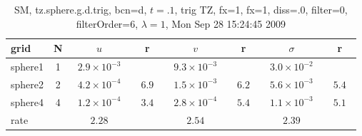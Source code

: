 \begin{table}[hbt]\tableFont %
\begin{center}
\begin{tabular}{|l|c|c|c|c|c|c|c|} \hline 
grid  & N &  $u$  & r &  $v$  & r &  $\sigma$   & r \\ \hline 
             sphere1 &     1 & ~$2.9\times10^{ -3}$~ &           & ~$9.3\times10^{ -3}$~ &           & ~$3.0\times10^{ -2}$~ &            \\ \hline
             sphere2 &     2 & ~$4.2\times10^{ -4}$~ & ~$  6.9$~ & ~$1.5\times10^{ -3}$~ & ~$  6.2$~ & ~$5.6\times10^{ -3}$~ & ~$  5.4$~  \\ \hline
             sphere4 &     4 & ~$1.2\times10^{ -4}$~ & ~$  3.4$~ & ~$2.8\times10^{ -4}$~ & ~$  5.4$~ & ~$1.1\times10^{ -3}$~ & ~$  5.1$~  \\ \hline
    rate             &       &       $2.28$         &       &       $2.54$         &       &       $2.39$         &        \\ \hline
\end{tabular}
\caption{SM, tz.sphere.g.d.trig, bcn=d, $t=.1$, trig TZ, fx=1, fx=1, diss=.0, filter=0, filterOrder=6, $\lambda=1$, Mon Sep 28 15:24:45 2009}\label{table:tz.sphere.g.d.trig}
\end{center}
\end{table}
